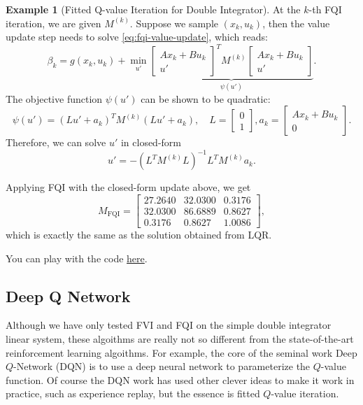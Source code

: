 \documentclass[
]{book}
\theoremstyle{definition}
\theoremstyle{definition}
\newtheorem{example}{Example}[chapter]
\theoremstyle{definition}
\theoremstyle{definition}
\theoremstyle{remark}
\begin{document}
\begin{example}[Fitted Q-value Iteration for Double Integrator]
At the \(k\)-th FQI iteration, we are given \(M^{(k)}\). Suppose we sample \((x_k, u_k)\), then the value update step needs to solve \eqref{eq:fqi-value-update}, which reads:
\[
\beta_k = g(x_k, u_k) + \min_{u'} \underbrace{\begin{bmatrix} A x_k + B u_k \\ u' \end{bmatrix}^T M^{(k)} \begin{bmatrix} A x_k + B u_k \\ u' \end{bmatrix}}_{\psi(u')}.
\]
The objective function \(\psi(u')\) can be shown to be quadratic:
\[
\psi(u') = (Lu' + a_k)^T M^{(k)} (Lu' + a_k), \quad L = \begin{bmatrix} 0 \\ 1 \end{bmatrix}, a_k = \begin{bmatrix} A x_k + B u_k \\ 0 \end{bmatrix}.
\]
Therefore, we can solve \(u'\) in closed-form
\[
u' = - (L^T M^{(k)} L)^{-1} L^T M^{(k)} a_k.
\]

Applying FQI with the closed-form update above, we get
\[
M_{\mathrm{FQI}} = \begin{bmatrix}
27.2640 & 32.0300 & 0.3176 \\
32.0300 & 86.6889 & 0.8627 \\
0.3176 & 0.8627 & 1.0086 
\end{bmatrix},
\]
which is exactly the same as the solution obtained from LQR.

You can play with the code \href{https://github.com/ComputationalRobotics/OptimalControlEstimation-Examples/blob/main/LQR_FQI_Example.m}{here}.
\end{example}

\hypertarget{deep-q-network}{%
\subsection{Deep Q Network}\label{deep-q-network}}

Although we have only tested FVI and FQI on the simple double integrator linear system, these algoithms are really not so different from the state-of-the-art reinforcement learning algoithms. For example, the core of the seminal work Deep \(Q\)-Network (DQN) \citep{mnih15nature-dqn} is to use a deep neural network to parameterize the \(Q\)-value function. Of course the DQN work has used other clever ideas to make it work in practice, such as experience replay, but the essence is fitted \(Q\)-value iteration.
\end{document}
